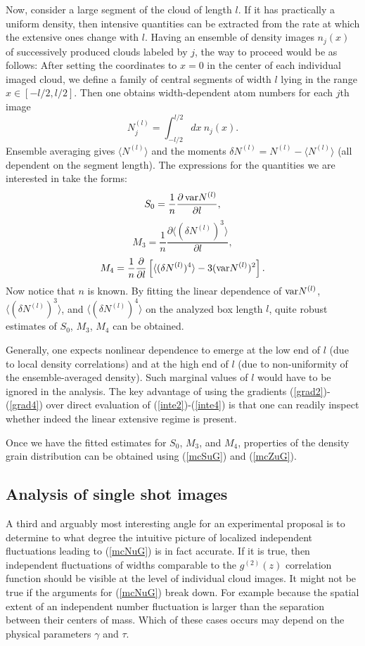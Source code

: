 \documentclass[aps,twocolumn,pra,superscriptaddress,nofootinbib,amsmath,amssymb,floats,floatfix,english]{revtex4-1}
\newcommand{\eqn}[1]{(\ref{#1})}
\renewcommand{\eq}[2]{\begin{equation}\label{#1}#2\end{equation}}
\begin{document}
Now, consider a large segment of the cloud of length $l$. If it has practically a uniform density, then intensive quantities can be extracted from the rate at which the extensive ones change with $l$. 
Having an ensemble of density images $n_j(x)$ of successively produced clouds labeled by $j$, the way to proceed
would be as follows: 
After setting the coordinates to $x=0$ in the center of each individual imaged cloud,  
we define a family of central segments of width $l$  lying in the range $x\in [-l/2, l/2]$. Then one obtains width-dependent atom numbers for each $j$th image
\eq{Njl}{
N_j^{(l)} = \int_{-l/2}^{l/2} dx\ n_j(x).
}
Ensemble averaging gives  $\langle N^{(l)}\rangle$ and the moments $\delta N^{(l)}=N^{(l)}-\langle N^{(l)}\rangle$   
(all dependent on the segment length). 
The expressions for the quantities we are interested in take the forms:
\eq{grad2}{
S_0 = \frac{1}{n}\frac{\partial\,{\rm var}N^{(l)}}{\partial l},
}
\eq{grad3}{
M_3 = \frac{1}{n}\frac{\partial\langle(\delta N^{(l)})^3\rangle}{\partial l},
}
\eq{grad4}{
M_4 = \frac{1}{n}\frac{\partial}{\partial l}\left[\langle(\delta N^{(l)})^4\rangle-3({\rm var}N^{(l)})^2\right].
}
Now notice that $n$ is known.
By fitting the linear dependence of ${\rm var}N^{(l)}$, $\langle(\delta N^{(l)})^3\rangle$, and $\langle(\delta N^{(l)})^4\rangle$
on the analyzed box length $l$, quite robust estimates of $S_0$, $M_3$, $M_4$ can be obtained. 

Generally, one expects nonlinear dependence to emerge at the low end of $l$ (due to local density correlations) and at the high end of $l$ (due to non-uniformity of the ensemble-averaged density). Such marginal values of $l$ would have to be ignored in the analysis.
The key  advantage of using the gradients \eqn{grad2}-\eqn{grad4} over direct evaluation of \eqn{inte2}-\eqn{inte4} is that one can readily inspect whether indeed the linear extensive regime is present.

Once we have the fitted estimates for $S_0$, $M_3$, and $M_4$, properties of the density grain distribution can be obtained  using  \eqn{mcSuG} and \eqn{mcZuG}.


\subsection{Analysis of single shot images}
\label{OBS_SHOT}
A third and arguably most interesting angle for an experimental proposal is 
to determine to what degree the intuitive picture of localized independent fluctuations leading to \eqn{mcNuG} is in fact accurate. 
If it is true, then independent fluctuations of widths comparable to the $g^{(2)}(z)$ correlation function should be visible at the level of individual cloud images. 
It might not be true if the arguments for \eqn{mcNuG} break down. For example because the spatial extent of an independent number fluctuation is larger than the separation between their centers of mass. Which of these cases occurs may depend on the physical parameters $\gamma$ and $\tau$.
\end{document}
